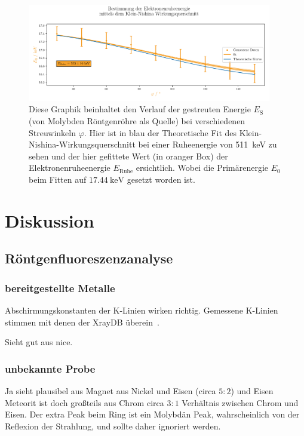 \documentclass[12pt,english,ngerman]{scrartcl}
\begin{document}
\begin{figure}[H]
	\centering
	\includegraphics[width=0.95\textwidth]{figures/Klein-Nishina.pdf}
	\caption{Diese Graphik beinhaltet den Verlauf der gestreuten
		Energie $E_\text{S}$ (von Molybden Röntgenröhre als Quelle)
		bei verschiedenen Streuwinkeln $\varphi$.
		Hier ist in blau der Theoretische Fit des Klein-Nishina-Wirkungsquerschnitt
		bei einer Ruheenergie von \SI{511}{\kilo\eV} zu sehen und
		der hier gefittete Wert (in oranger Box) der
		Elektronenruheenergie $E_\text{Ruhe}$ ersichtlich. Wobei
		die Primärenergie $E_0$ beim Fitten auf $\SI{17.44}{\kilo\electronvolt}$
		gesetzt worden ist.
	}\label{fig:Klein-Nishina}
\end{figure}

\section{Diskussion}\label{sec:diskussion}

\subsection{Röntgenfluoreszenzanalyse}

\subsubsection{bereitgestellte Metalle}
Abschirmungskonstanten der K-Linien wirken richtig. Gemessene K-Linien stimmen
mit denen der XrayDB überein~\cite{newville_xraypyxraydb_2023}.

Sieht gut aus nice.

\subsubsection{unbekannte Probe}

Ja sieht plausibel aus Magnet aus Nickel und Eisen (circa $5:2$) und Eisen
Meteorit ist doch großteils aus Chrom circa $3:1$ Verhältnis zwischen Chrom und
Eisen. Der extra Peak beim Ring ist ein Molybdän Peak, wahrscheinlich von der
Reflexion der Strahlung, und sollte daher ignoriert werden.
\end{document}
